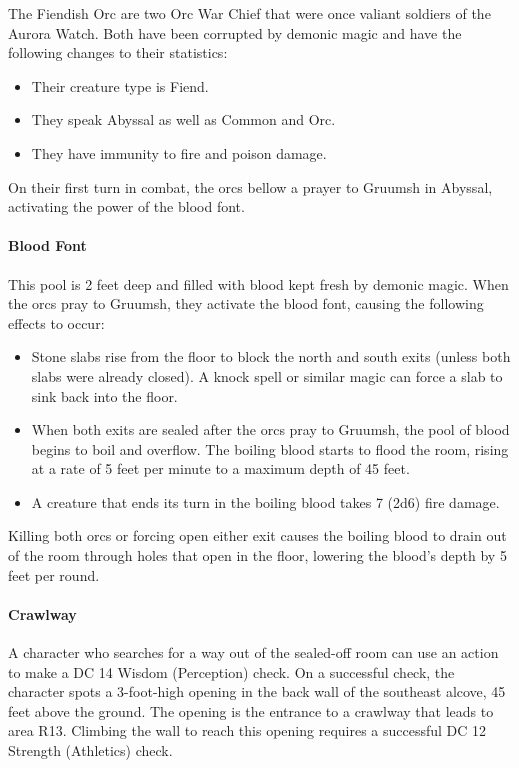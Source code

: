 \documentclass[10pt,a4paper,twoside,twocolumn,openany,nodeprecatedcode]{dndbook}
\begin{document}
The Fiendish Orc are two Orc War Chief that were once valiant soldiers of the Aurora Watch. Both have been corrupted by demonic magic and have the following changes to their statistics:


\begin{itemize}
\item Their creature type is Fiend.
\item They speak Abyssal as well as Common and Orc.
\item They have immunity to fire and poison damage.
\end{itemize}

On their first turn in combat, the orcs bellow a prayer to Gruumsh in Abyssal, activating the power of the blood font.

\paragraph{Blood Font}
This pool is 2 feet deep and filled with blood kept fresh by demonic magic. When the orcs pray to Gruumsh, they activate the blood font, causing the following effects to occur:


\begin{itemize}
\item Stone slabs rise from the floor to block the north and south exits (unless both slabs were already closed). A knock spell or similar magic can force a slab to sink back into the floor.
\item When both exits are sealed after the orcs pray to Gruumsh, the pool of blood begins to boil and overflow. The boiling blood starts to flood the room, rising at a rate of 5 feet per minute to a maximum depth of 45 feet.
\item A creature that ends its turn in the boiling blood takes 7 (2d6) fire damage.
\end{itemize}

Killing both orcs or forcing open either exit causes the boiling blood to drain out of the room through holes that open in the floor, lowering the blood's depth by 5 feet per round.

\paragraph{Crawlway}
A character who searches for a way out of the sealed-off room can use an action to make a DC 14 Wisdom (Perception) check. On a successful check, the character spots a 3-foot-high opening in the back wall of the southeast alcove, 45 feet above the ground. The opening is the entrance to a crawlway that leads to area R13. Climbing the wall to reach this opening requires a successful DC 12 Strength (Athletics) check.
\end{document}
